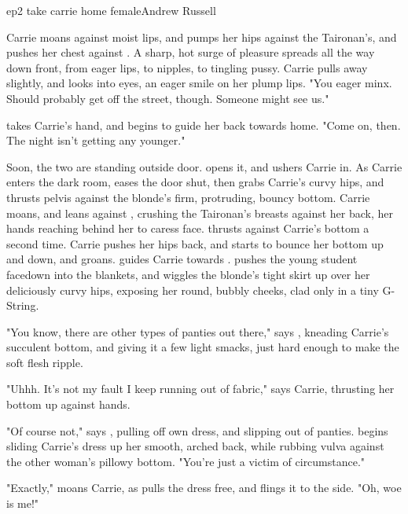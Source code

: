 \documentclass{book}
\begin{document}
\begin{childnode}{ep2 take carrie home female}{Andrew Russell}

    Carrie moans against \names{} moist lips, and pumps her hips against the Taironan's, and pushes her chest against \names{}. A sharp, hot surge of pleasure
    spreads all the way down \names{} front, from \hisher{} eager lips, to \hisher{} nipples, to \hisher{} tingling pussy. Carrie pulls away slightly, and looks into \names{} eyes, an eager smile on her plump lips. "You eager minx. 
    Should probably get off the street, though. Someone might see us."
    
    \name{} takes Carrie's hand, and begins to guide her back towards \names{} home. "Come on, then. The night isn't getting any younger."

    Soon, the two are standing outside \names{} door. \name{} opens it, and ushers Carrie in. As Carrie enters the dark room, \name{} eases the door shut, then
    grabs Carrie's curvy hips, and thrusts \hisher{} pelvis against the blonde's firm, protruding, bouncy bottom. Carrie moans, and leans against \name{}, crushing the Taironan's 
     breasts against her back, her hands reaching behind her to caress \names{} face. \name{} thrusts against Carrie's bottom a second time. Carrie pushes her hips back, and
    starts to bounce her bottom up and down, and \name{} groans. \HeShe{} guides Carrie towards \hisher{} . \HeShe{} pushes the young student 
    facedown into the blankets, and wiggles the blonde's tight skirt up over her deliciously curvy hips, exposing
    her round, bubbly cheeks, clad only in a tiny G-String.

    "You know, there are other types of panties out there," says \name{}, kneading Carrie's succulent bottom, and giving it a few light smacks, just hard enough to make the soft flesh ripple.

    "Uhhh. It's not my fault I keep running out of fabric," says Carrie, thrusting her bottom up against \names{} hands. 

    "Of course not," says \name{}, pulling off \hisher{} own dress, and slipping out of \hisher{} panties. \HeShe{} begins sliding Carrie's dress up her smooth, arched back, while rubbing \hisher{} 
    vulva against the other woman's pillowy bottom. "You're just a victim of circumstance."

    "Exactly," moans Carrie, as \name{} pulls the dress free, and flings it to the side. "Oh, woe is me!"



\end{childnode}
\end{document}
